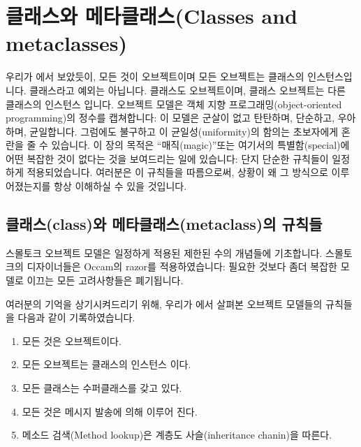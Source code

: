\documentclass[a4paper,10pt,twoside]{book}
\begin{document}
	\renewcommand{\nnbb}[2]{} %
	\sloppy
\fi
\chapter{클래스와 메타클래스(Classes and metaclasses)}
\label{cha:metaclasses}


우리가 에서 보았듯이,  모든 것이 오브젝트이며 모든 오브젝트는 클래스의 인스턴스입니다. 
클래스라고 예외는 아닙니다. 클래스도 오브젝트이며, 클래스 오브젝트는 다른 클래스의 인스턴스 입니다. 오브젝트 모델은 객체 지향 프로그래밍(object-oriented programming)의 정수를 캡쳐합니다: 이 모델은 군살이 없고 탄탄하며, 단순하고, 우아하며, 균일합니다. 
그럼에도 불구하고 이 균일성(uniformity)의 함의는 초보자에게 혼란을 줄 수 있습니다. 이 장의 목적은 ``매직(magic)''또는 여기서의 특별함(special)에 어떤 복잡한 것이 없다는 것을 보여드리는 일에 있습니다: 단지 단순한 규칙들이 일정하게 적용되었습니다. 
여러분은 이 규칙들을 따름으로써, 상황이 왜 그 방식으로 이루어졌는지를 항상 이해하실 수 있을 것입니다. 

\section{클래스(class)와 메타클래스(metaclass)의 규칙들}

스몰토크 오브젝트 모델은 일정하게 적용된 제한된 수의 개념들에 기초합니다. 
스몰토크의 디자이너들은 Occam의 razor를 적용하였습니다: 필요한 것보다 좀더 복잡한 모델로 이끄는 모든 고려사항들은 폐기됩니다. 

여러분의 기억을 상기시켜드리기 위해, 우리가 에서 살펴본 오브젝트 모델들의 규칙들을 다음과 같이 기록하였습니다.  

\begin{enumerate}[label={\textbf{Rule \arabic{*}}.}, ref={Rule \arabic{*}}, leftmargin=*, widest=10]
\item{} %
    모든 것은 오브젝트이다.

\item{} %
    모든 오브젝트는 클래스의 인스턴스 이다.

\item{} %
    모든 클래스는 수퍼클래스를 갖고 있다.

\item{} %
    모든 것은 메시지 발송에 의해 이루어 진다.

\item{} %
    메소드 검색(Method lookup)은 계층도 사슬(inheritance chanin)을 따른다.

\end{enumerate}
\end{document}

